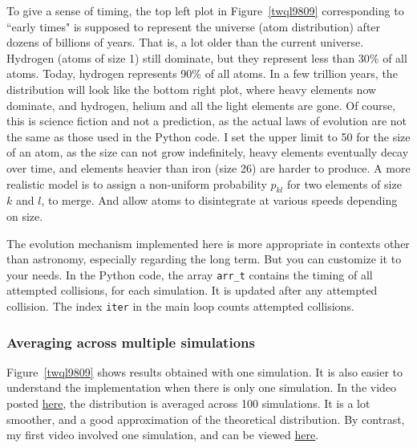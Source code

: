 \documentclass[oneside,10pt]{book}
\begin{document}
To give a sense of timing, the top left plot in Figure~\ref{twql9809} corresponding to ``early times"  is supposed to represent the universe (atom distribution) after dozens of billions of years. That is, a lot older than the current universe.
 Hydrogen (atoms of size 1) still dominate, but they represent less than 30\% of all atoms. Today, hydrogen represents 90\% of all atoms. In a few trillion years, the distribution will look like the bottom right plot, where heavy elements now dominate, and hydrogen, helium and all the light elements are gone. Of course, this is science fiction and not a prediction, as the actual laws of evolution are not the same as those used in the Python code.
I set the upper limit to 50 for the size of an atom, as the size can not grow indefinitely, heavy elements eventually decay over time, and elements heavier than iron (size 26) are harder to produce. A more realistic model is to assign a non-uniform  probability $p_{kl}$ for two elements of size $k$ and $l$, to merge. And allow atoms to disintegrate at various speeds depending on size.

The evolution mechanism implemented here is more appropriate in contexts other than astronomy, especially regarding the long term. But you can customize it to your needs.
In the Python code, the array \texttt{arr\_t} contains the timing of all attempted collisions, for each simulation. It is updated after any attempted collision. The index \texttt{iter} in the main loop counts attempted collisions.


\subsubsection{Averaging across multiple simulations}

Figure~\ref{twql9809} shows results obtained with one simulation. It is also easier to understand the implementation when there is only one simulation. In the video posted \href{https://www.youtube.com/watch?v=MUvoO9YmfgY}{here}, the distribution is averaged across 100 simulations. It is a lot smoother, and a good approximation of the theoretical distribution. By contrast, my first video involved one simulation, and
 can be viewed \href{https://www.youtube.com/watch?v=g3tc2ARw7B0}{here}.
\end{document}
